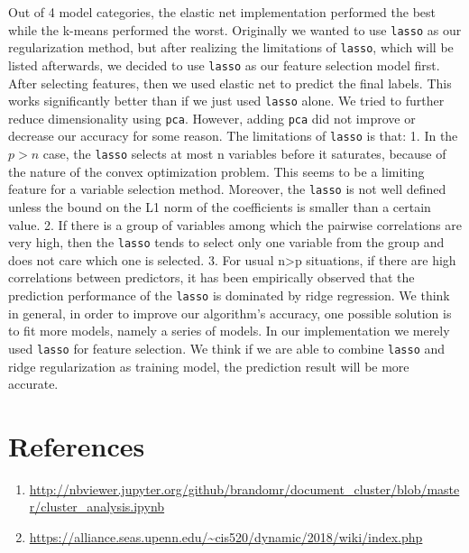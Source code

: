 \documentclass[english]{article}
\begin{document}
Out of 4 model categories, the elastic net implementation performed the best while the k-means performed the worst. Originally we wanted to use \texttt{lasso} as our regularization method, but after realizing the limitations of \texttt{lasso}, which will be listed afterwards, we decided to use \texttt{lasso} as our feature selection model first. After selecting features, then we used elastic net to predict the final labels. This works significantly better than if we just used \texttt{lasso} alone. We tried to further reduce dimensionality using \texttt{pca}. However, adding \texttt{pca} did not improve or decrease our accuracy for some reason. The limitations of \texttt{lasso} is that: 1. In the $p>n$ case, the \texttt{lasso} selects at most n variables before it saturates, because of the nature of the convex optimization problem. This seems to be a limiting feature for a variable selection method. Moreover, the \texttt{lasso} is not well defined unless the bound on the L1 norm of the coefficients is smaller than a certain value. 2. If there is a group of variables among which the pairwise correlations are very high, then the \texttt{lasso} tends to select only one variable from the group and does not care which one is selected. 3. For usual n>p situations, if there are high correlations between predictors, it has been empirically observed that the prediction performance of the \texttt{lasso} is dominated by ridge regression. We think in general, in order to improve our algorithm's accuracy, one possible solution is to fit more models, namely a series of models. In our implementation we merely used \texttt{lasso} for feature selection. We think if we are able to combine \texttt{lasso} and ridge regularization as training model, the prediction result will be more accurate.
\section{References}
\begin{enumerate}
\item \url{http://nbviewer.jupyter.org/github/brandomr/document_cluster/blob/master/cluster_analysis.ipynb}
\item \url{https://alliance.seas.upenn.edu/~cis520/dynamic/2018/wiki/index.php}
\end{enumerate}
\end{document}
